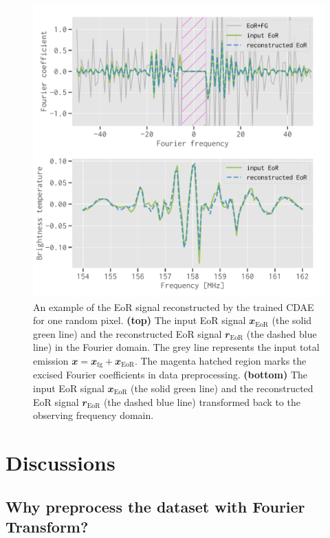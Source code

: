 \documentclass[letters,fleqn,usenatbib]{mnras}
\newlength{\myfigwidth}
\newcommand{\R}[1]{\mathrm{#1}}
\newcommand{\B}[1]{\mathbfit{#1}}
\begin{document}
\begin{figure}
  \centering
  \includegraphics[width=\myfigwidth]{eor-result}
  \caption{\label{fig:result}%
    An example of the EoR signal reconstructed by the trained CDAE for
    one random pixel.
    \textbf{(top)} The input EoR signal $\B{x}_{\R{EoR}}$ (the solid
    green line) and the reconstructed EoR signal $\B{r}_{\R{EoR}}$
    (the dashed blue line) in the Fourier domain.
    The grey line represents the input total emission
    $\B{x} = \B{x}_{\R{fg}} + \B{x}_{\R{EoR}}$.
    The magenta hatched region marks the excised Fourier coefficients
    in data preprocessing.
    \textbf{(bottom)} The input EoR signal $\B{x}_{\R{EoR}}$ (the solid
    green line) and the reconstructed EoR signal $\B{r}_{\R{EoR}}$
    (the dashed blue line) transformed back to the observing frequency
    domain.
  }
\end{figure}


\section{Discussions}
\label{sec:discussions}

\subsection{Why preprocess the dataset with Fourier Transform?}
\label{sec:why-ft}
\end{document}
